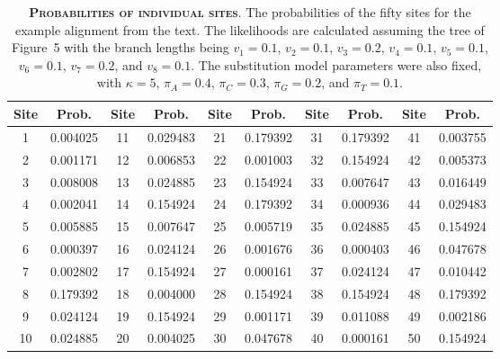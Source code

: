 \documentclass{svmult}
\begin{document}
\begin{table}[b]
\centering
\caption{\textbf{\textsc{Probabilities of individual sites}}.
The probabilities of the fifty sites for the example alignment from the text. The likelihoods are calculated assuming the tree
of Figure~5 with the branch lengths being $v_1 = 0.1$, $v_2 = 0.1$, $v_3 = 0.2$, $v_4 = 0.1$, $v_5 = 0.1$, $v_6 = 0.1$,
$v_7 = 0.2$, and $v_8 = 0.1$. The substitution model parameters were also fixed, with 
$\kappa = 5$, $\pi_A = 0.4$, $\pi_C = 0.3$, $\pi_G = 0.2$, and $\pi_T = 0.1$.}
\begin{tabular}{cccccccccc}
Site  & Prob.               & Site        & Prob.               & Site        & Prob.              & Site        & Prob.               & Site        & Prob.              \\ \hline
1	&	0.004025	&	11	&	0.029483	&	21	&	0.179392	&	31	&	0.179392	&	41	&	0.003755 \\
2	&	0.001171	&	12	&	0.006853	&	22	&	0.001003	&	32	&	0.154924	&	42	&	0.005373 \\
3	&	0.008008	&	13	&	0.024885	&	23	&	0.154924	&	33	&	0.007647	&	43	&	0.016449 \\
4	&	0.002041	&	14	&	0.154924	&	24	&	0.179392	&	34	&	0.000936	&	44	&	0.029483 \\
5	&	0.005885	&	15	&	0.007647	&	25	&	0.005719	&	35	&	0.024885	&	45	&	0.154924 \\
6	&	0.000397	&	16	&	0.024124	&	26	&	0.001676	&	36	&	0.000403	&	46	&	0.047678 \\
7	&	0.002802	&	17	&	0.154924	&	27	&	0.000161	&	37	&	0.024124	&	47	&	0.010442 \\
8	&	0.179392	&	18	&	0.004000	&	28	&	0.154924	&	38	&	0.154924	&	48	&	0.179392 \\
9	&	0.024124	&	19	&	0.154924	&	29	&	0.001171	&	39	&	0.011088	&	49	&	0.002186 \\
10	&	0.024885	&	20	&	0.004025	&	30	&	0.047678	&	40	&	0.000161	&	50	&	0.154924 \\ \hline
\end{tabular}
\label{tab1}
\end{table}
\end{document}

